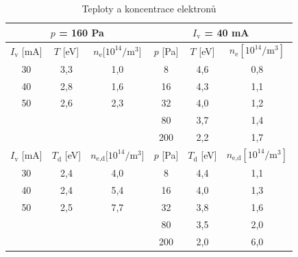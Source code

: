 \documentclass[a4paper,12pt]{article}
\begin{document}
\begin{center}
	\begin{table}[h!]
		\centering
		\caption{Teploty a koncentrace elektronů}
		\label{tab2}
		\begin{tabular}{|c|c|c|c|c|c|} \hline
			 \multicolumn{3}{|c|}{$p$ = 160 \si{\pascal}}& \multicolumn{3}{c|}{$I_\text{v}$ = 40 \si{\milli\ampere} }  \\ \hline
			$I_\text{v}$ [\si{\milli\ampere}] &  $T$ [eV] & $n_\text{e} [10^{14}\si{\per\meter\cubed}$] & $p$ [\si{\pascal}] &  $T$ [eV] & $n_\text{e} [10^{14}\si{\per\meter\cubed}]$ \\ \hline
			30 & 3,3 & 1,0 & 8 & 4,6 & 0,8\\ \hline
			40 & 2,8 & 1,6 & 16 & 4,3 & 1,1 \\ \hline
			50 & 2,6 & 2,3 & 32 & 4,0 & 1,2\\ \hline
			&  &  & 80 & 3,7 & 1,4 \\ \hline
			& &  & 200 & 2,2 & 1,7 \\ \hline
			$I_\text{v}$ [\si{\milli\ampere}] &  $T_\text{d}$ [eV] & 
			$n_\text{e,d} [10^{14}\si{\per\meter\cubed}$] & $p$ [\si{\pascal}] 
			&  $T_\text{d}$ [eV] & $n_\text{e,d} 
			[10^{14}\si{\per\meter\cubed}]$ \\ \hline
			30 & 2,4 & 4,0 & 8 & 4,4 & 1,1\\ \hline
			40 & 2,4 & 5,4 & 16 & 4,0 & 1,3 \\ \hline
			50 & 2,5 & 7,7 & 32 & 3,8 & 1,6\\ \hline
			&  &  & 80 & 3,5 & 2,0 \\ \hline
			& &  & 200 & 2,0 & 6,0 \\ \hline
			
		\end{tabular}
	\end{table}
\end{center}
\newpage
\end{document}
